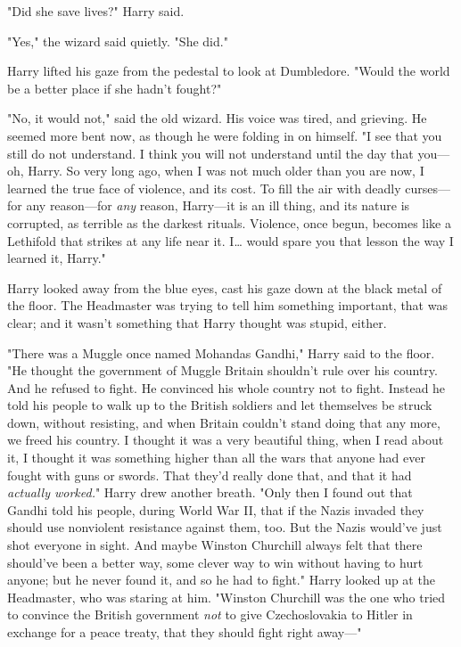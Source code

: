 "Did she save lives?" Harry said.

"Yes," the wizard said quietly. "She did."

Harry lifted his gaze from the pedestal to look at Dumbledore. "Would the world
be a better place if she hadn't fought?"

"No, it would not," said the old wizard. His voice was tired, and grieving. He
seemed more bent now, as though he were folding in on himself. "I see that you
still do not understand. I think you will not understand until the day that
you---oh, Harry. So very long ago, when I was not much older than you are now,
I learned the true face of violence, and its cost. To fill the air with deadly
curses---for any reason---for \emph{any} reason, Harry---it is an ill thing,
and its nature is corrupted, as terrible as the darkest rituals. Violence, once
begun, becomes like a Lethifold that strikes at any life near it. I{\ldots}
would spare you that lesson the way I learned it, Harry."

Harry looked away from the blue eyes, cast his gaze down at the black metal of
the floor. The Headmaster was trying to tell him something important, that was
clear; and it wasn't something that Harry thought was stupid, either.

"There was a Muggle once named Mohandas Gandhi," Harry said to the floor. "He
thought the government of Muggle Britain shouldn't rule over his country. And
he refused to fight. He convinced his whole country not to fight. Instead he
told his people to walk up to the British soldiers and let themselves be struck
down, without resisting, and when Britain couldn't stand doing that any more,
we freed his country. I thought it was a very beautiful thing, when I read
about it, I thought it was something higher than all the wars that anyone had
ever fought with guns or swords. That they'd really done that, and that it had
\emph{actually worked.}" Harry drew another breath. "Only then I found out that
Gandhi told his people, during World War II, that if the Nazis invaded they
should use nonviolent resistance against them, too. But the Nazis would've just
shot everyone in sight. And maybe Winston Churchill always felt that there
should've been a better way, some clever way to win without having to hurt
anyone; but he never found it, and so he had to fight." Harry looked up at the
Headmaster, who was staring at him. "Winston Churchill was the one who tried to
convince the British government \emph{not} to give Czechoslovakia to Hitler in
exchange for a peace treaty, that they should fight right away---"

